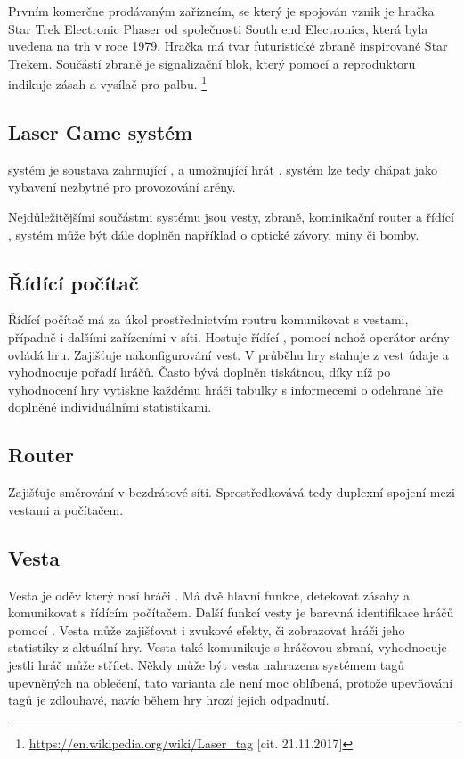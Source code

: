 Prvním komerčne prodávaným zařízneím, se který je spojován vznik  je hračka Star Trek Electronic Phaser od společnosti South end Electronics, která byla uvedena na trh v roce 1979. Hračka má tvar futuristické zbraně inspirované Star Trekem. Součástí zbraně je signalizační blok, který pomocí  a reproduktoru indikuje zásah a  vysílač pro palbu.
\footnote{\url{https://en.wikipedia.org/wiki/Laser_tag} [cit. 21.11.2017]}

\subsection{Laser Game systém}
 systém je soustava zahrnující ,  a  umožnující hrát .  systém lze tedy chápat jako vybavení nezbytné pro provozování  arény.

Nejdůležitějšími součástmi  systému jsou vesty, zbraně, kominikační router a řídící ,  systém může být dále doplněn například o optické závory, miny či bomby.

\subsection{Řídící počítač}
Řídící počítač má za úkol prostřednictvím routru komunikovat s vestami, případně i dalšími zařízeními v síti. Hostuje řídící , pomocí nehož operátor arény ovládá hru. Zajišťuje nakonfigurování vest. V průběhu hry stahuje z vest údaje a vyhodnocuje pořadí hráčů. Často bývá doplněn tiskátnou, díky níž po vyhodnocení hry vytiskne každému hráči tabulky s informecemi o odehrané hře doplněné individuálními statistikami.

\subsection{Router}
Zajišťuje směrování v bezdrátové  síti. Sprostředkovává tedy duplexní spojení mezi vestami a počítačem.

\subsection{Vesta}
Vesta je oděv který nosí hráči . Má dvě hlavní funkce, detekovat zásahy a komunikovat s řídícím počítačem. Další funkcí vesty je barevná identifikace hráčů pomocí  . Vesta může zajišťovat i zvukové efekty, či zobrazovat hráči jeho statistiky z aktuální hry. Vesta také komunikuje s hráčovou zbraní, vyhodnocuje jestli hráč může střílet. Někdy může být vesta nahrazena systémem tagů upevněných na oblečení, tato varianta ale není moc oblíbená, protože upevňování tagů je zdlouhavé, navíc během hry hrozí jejich odpadnutí.

